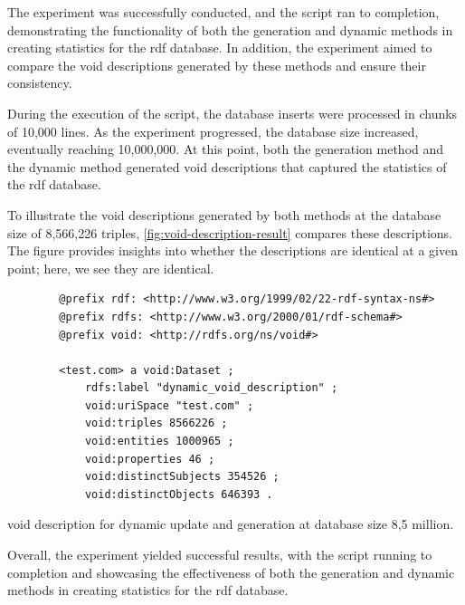 The experiment was successfully conducted, and the script ran to completion, demonstrating the functionality of both the generation and dynamic methods in creating statistics for the  \gls{rdf} database. In addition, the experiment aimed to compare the \gls{void} descriptions generated by these methods and ensure their consistency.

During the execution of the script, the database inserts were processed in chunks of 10,000 lines. As the experiment progressed, the database size increased, eventually reaching 10,000,000. At this point, both the generation method and the dynamic method generated \gls{void} descriptions that captured the statistics of the  \gls{rdf} database.

To illustrate the \gls{void} descriptions generated by both methods at the database size of 8,566,226 triples, \autoref{fig:void-description-result} compares these descriptions. The figure provides insights into whether the descriptions are identical at a given point; here, we see they are identical.


\begin{listing}[htb!]
    \begin{verbatim}
        @prefix rdf: <http://www.w3.org/1999/02/22-rdf-syntax-ns#>
        @prefix rdfs: <http://www.w3.org/2000/01/rdf-schema#>
        @prefix void: <http://rdfs.org/ns/void#>
        
        <test.com> a void:Dataset ;
            rdfs:label "dynamic_void_description" ;
            void:uriSpace "test.com" ;
            void:triples 8566226 ;
            void:entities 1000965 ;
            void:properties 46 ;
            void:distinctSubjects 354526 ;
            void:distinctObjects 646393 .
    \end{verbatim}
    \caption{\gls{void} description for dynamic update and generation at database size 8,5 million.}
    \label{fig:void-description-result}
\end{listing}

Overall, the experiment yielded successful results, with the script running to completion and showcasing the effectiveness of both the generation and dynamic methods in creating statistics for the  \gls{rdf} database.












